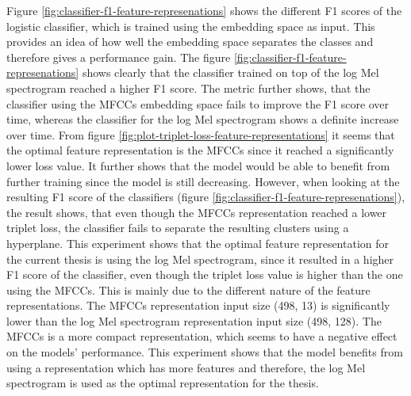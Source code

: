 Figure \ref{fig:classifier-f1-feature-represenations} shows the different F1 scores of the logistic classifier, which is trained using the embedding space as input. This provides an idea of how well the embedding space separates the classes and therefore gives a performance gain. The figure \ref{fig:classifier-f1-feature-represenations} shows clearly that the classifier trained on top of the log Mel spectrogram reached a higher F1 score. The metric further shows, that the classifier using the MFCCs embedding space fails to improve the F1 score over time, whereas the classifier for the log Mel spectrogram shows a definite increase over time.
\newline
\newline
From figure \ref{fig:plot-triplet-loss-feature-representations} it seems that the optimal feature representation is the MFCCs since it reached a significantly lower loss value. It further shows that the model would be able to benefit from further training since the model is still decreasing. However, when looking at the resulting F1 score of the classifiers (figure \ref{fig:classifier-f1-feature-represenations}), the result shows, that even though the MFCCs representation reached a lower triplet loss, the classifier fails to separate the resulting clusters using a hyperplane. 
\newline
\newline
This experiment shows that the optimal feature representation for the current thesis is using the log Mel spectrogram, since it resulted in a higher F1 score of the classifier, even though the triplet loss value is higher than the one using the MFCCs. 
\newline
\newline
This is mainly due to the different nature of the feature representations. The MFCCs representation input size (498, 13) is significantly lower than the log Mel spectrogram representation input size (498, 128). The MFCCs is a more compact representation, which seems to have a negative effect on the models' performance.
\newline
\newline
This experiment shows that the model benefits from using a representation which has more features and therefore, the log Mel spectrogram is used as the optimal representation for the thesis.

